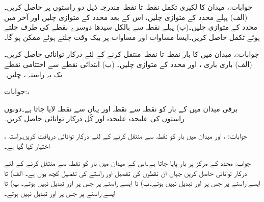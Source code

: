 جوابات:، 
میدان  کا لکیری تکمل  نقطہ  تا نقطہ  مندرجہ ذیل دو راستوں پر حاصل کریں۔(الف) پہلے  محدد کے متوازی چلیں، اس کے بعد  محدد کے متوازی چلیں اور آخر میں  محدد کے متوازی چلیں۔(ب) پہلے نقطہ سے بالکل سیدھا دوسرے نقطے کی طرف چلتے ہوئے تکمل حاصل کریں۔ایسا مساوات  اور مساوات  پر بیک وقت چلتے ہوئے ممکن ہو گا۔ 

جوابات:، 
میدان  میں  کا بار نقطہ  تا نقطہ  منتقل کرنے کے لئے درکار توانائی حاصل کریں۔(الف) باری باری ،  اور  محدد کے متوازی چلیں۔ (ب) ابتدائی نقطے سے اختتامی نقطے تک بہ راستہ ،  چلیں۔

جوابات:، 

برقی میدان  میں  کے بار کو نقطہ  سے نقطہ  اور  یہاں سے نقطہ  لایا جاتا ہے۔دونوں راستوں کی علیحدہ علیحدہ اور کُل درکار توانائی حاصل کریں۔

جوابات: ،  اور 
میدان  میں بار  کو نقطہ  سے  منتقل کرنے کے لئے درکار توانائی دریافت کریں۔راستہ ،  اختیار کیا گیا ہے۔

جواب:
محدد کے مرکز پر  بار پایا جاتا ہے۔اس کے میدان میں بار  کو نقطہ  سے  منتقل کرنے کے لئے درکار توانائی حاصل کریں جہاں ان نقطوں کی تفصیل اور راستے کی تفصیل کچھ یوں ہے۔ الف)  تا  ایسے راستے پر جس پر  اور  تبدیل نہیں ہوتے۔ب)  تا  ایسے راستے پر جس پر  اور  تبدیل نہیں ہوتے۔ پ)  تا  ایسے راستے پر جس پر  اور  تبدیل نہیں ہوتے۔

